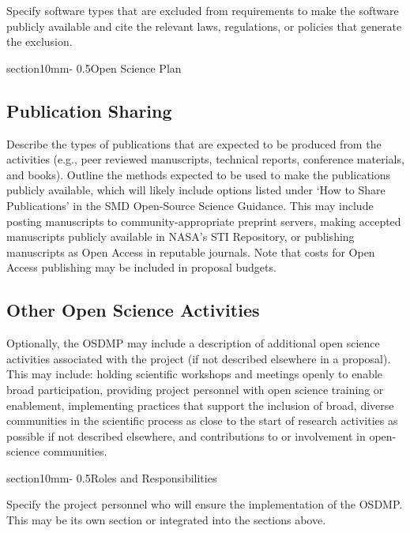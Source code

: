 \documentclass[letterpaper,12pt]{article}
\makeatletter
\renewcommand{\section}{\@startsection%
{section}{1}{0mm}{-\baselineskip}%
{0.5\baselineskip}{\normalfont\Large\bfseries}}%
\makeatother
\begin{document}
Specify software types that are excluded from requirements to make the software publicly available and cite the relevant laws, regulations, or policies that generate the exclusion.

\section{Open Science Plan}

\subsection{Publication Sharing}

Describe the types of publications that are expected to be produced from the activities (e.g., peer reviewed manuscripts, technical reports, conference materials, and books). Outline the methods expected to be used to make the publications publicly available, which will likely include options listed under ‘How to Share Publications’ in the SMD Open-Source Science Guidance. This may include posting manuscripts to community-appropriate preprint servers, making accepted manuscripts publicly available in NASA's STI Repository, or publishing manuscripts as Open Access in reputable journals. Note that costs for Open Access publishing may be included in proposal budgets.

\subsection{Other Open Science Activities}

Optionally, the OSDMP may include a description of additional open science activities associated with the project (if not described elsewhere in a proposal). This may include: holding scientific workshops and meetings openly to enable broad participation, providing project personnel with open science training or enablement, implementing practices that support the inclusion of broad, diverse communities in the scientific process as close to the start of research activities as possible if not described elsewhere, and contributions to or involvement in open-science communities.

\section{Roles and Responsibilities}

Specify the project personnel who will ensure the implementation of the OSDMP. This may be its own section or integrated into the sections above.

\end{document}
